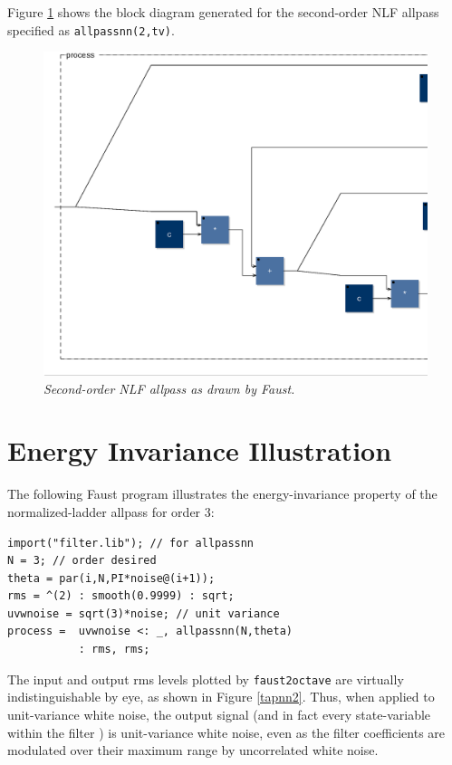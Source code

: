 \documentclass[twoside,a4paper]{article}
\begin{document}
Figure \ref{nlf2} shows the block diagram generated for the
second-order NLF allpass specified as \texttt{allpassnn(2,tv)}.

\begin{figure}[ht]
\center
\includegraphics[width=6.5in]{eps/nlf2.eps}
\caption{\label{nlf2}{\it Second-order NLF allpass as drawn by Faust.}}
\end{figure} 

\section{Energy Invariance Illustration}

The following Faust program illustrates the energy-invariance property
of the normalized-ladder allpass for order 3:
\begin{verbatim}
import("filter.lib"); // for allpassnn
N = 3; // order desired
theta = par(i,N,PI*noise@(i+1));
rms = ^(2) : smooth(0.9999) : sqrt;
uvwnoise = sqrt(3)*noise; // unit variance
process =  uvwnoise <: _, allpassnn(N,theta) 
           : rms, rms;
\end{verbatim}
The input and output rms levels plotted by \texttt{faust2octave} are
virtually indistinguishable by eye, as shown in Figure \ref{tapnn2}.
Thus, when applied to unit-variance white noise, the output signal
(and in fact every state-variable within the filter
\cite{GrayAndMarkel75}) is unit-variance white noise, even as the
filter coefficients are modulated over their maximum range by
uncorrelated white noise.
\end{document}
